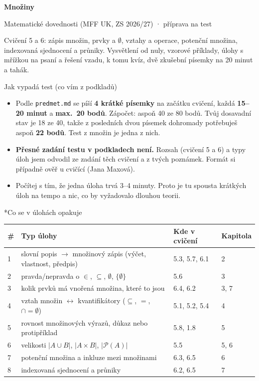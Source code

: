 \documentclass[10pt,a4paper]{article}
\makeatletter
\renewcommand{\subsection}{\Needspace{7\baselineskip}\@startsection{subsection}{2}{0pt}{2.2ex plus .3ex minus .1ex}{0.8ex}{\sffamily\bfseries\large\color{accent}}}
\newenvironment{odrazky}{\begin{itemize}[leftmargin=1.3em,itemsep=2pt,topsep=3pt]}{\end{itemize}}
\makeatother
\begin{document}
{\sffamily\bfseries\fontsize{27}{31}\selectfont\color{accent} Množiny}\par
{\sffamily\large\color{muted} Matematické dovednosti (MFF UK, ZS 2026/27) · příprava na test}\par
\vspace{4pt}
{\small Cvičení 5 a 6: zápis množin, prvky a $\emptyset$, vztahy a operace, potenční množina, indexovaná sjednocení a průniky. Vysvětlení od nuly, vzorové příklady, úlohy s mřížkou na psaní a řešení vzadu, k tomu kvíz, dvě zkušební písemky na 20 minut a tahák.}\par
\vspace{2pt}{\color{rulegray}\rule{\linewidth}{0.6pt}}\par

\begin{pozn}{Jak vypadá test (co vím z podkladů)}
\begin{odrazky}
  \item Podle \texttt{predmet.md} se píší \textbf{4 krátké písemky} na začátku cvičení, každá \textbf{15--20 minut} a \textbf{max.\ 20 bodů}. Zápočet: aspoň 40 ze 80 bodů. Tvůj dosavadní stav je 18 ze 40, takže z posledních dvou písemek dohromady potřebuješ aspoň \textbf{22 bodů}. Test z množin je jedna z nich.
  \item \textbf{Přesné zadání testu v podkladech není.} Rozsah (cvičení 5 a 6) a typy úloh jsem odvodil ze zadání těch cvičení a z tvých poznámek. Formát si případně ověř u cvičící (Jana Maxová).
  \item Počítej s tím, že jedna úloha trvá 3--4 minuty. Proto je tu spousta krátkých úloh na tempo a nic, co by vyžadovalo dlouhou teorii.
\end{odrazky}
\end{pozn}

\subsection*{Co se v úlohách opakuje}
\small
\begin{tabular}{@{}p{0.5cm}p{7.9cm}p{2.9cm}p{2.9cm}@{}}
\textbf{\#} & \textbf{Typ úlohy} & \textbf{Kde v cvičení} & \textbf{Kapitola}\\\midrule
1 & slovní popis $\to$ množinový zápis (výčet, vlastnost, předpis) & 5.3, 5.7, 6.1 & 2\\
2 & pravda/nepravda o $\in$, $\subseteq$, $\emptyset$, $\{\emptyset\}$ & 5.6 & 3\\
3 & kolik prvků má vnořená množina, které to jsou & 6.4, 6.2 & 3, 7\\
4 & vztah množin $\leftrightarrow$ kvantifikátory ($\subseteq$, $=$, $\cap=\emptyset$) & 5.1, 5.2, 5.4 & 4\\
5 & rovnost množinových výrazů, důkaz nebo protipříklad & 5.8, 1.8 & 5\\
6 & velikosti $|A\cup B|$, $|A\times B|$, $|\mathcal P(A)|$ & 5.5 & 5, 6\\
7 & potenční množina a inkluze mezi množinami & 6.3, 6.5 & 6\\
8 & indexovaná sjednocení a průniky & 6.2, 6.5 & 7\\
\end{tabular}
\normalsize
\end{document}
